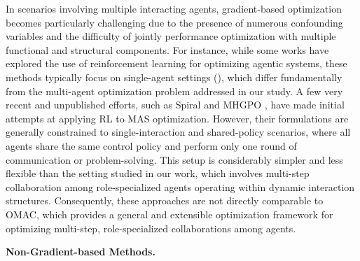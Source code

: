 In scenarios involving multiple interacting agents, gradient-based optimization becomes particularly challenging due to the presence of numerous confounding variables and the difficulty of jointly performance optimization with multiple functional and structural components. For instance, while some works have explored the use of reinforcement learning for optimizing agentic systems, these methods typically focus on single-agent settings (\cite{shao2024deepseekmath, qian2025toolrl}), which differ fundamentally from the multi-agent optimization problem addressed in our study.
A few very recent and unpublished efforts, such as Spiral \cite{liu2025spiral} and MHGPO \cite{chen2025heterogeneous}, have made initial attempts at applying RL to MAS optimization. However, their formulations are generally constrained to single-interaction and shared-policy scenarios, where all agents share the same control policy and perform only one round of communication or problem-solving. This setup is considerably simpler and less flexible than the setting studied in our work, which involves multi-step collaboration among role-specialized agents operating within dynamic interaction structures. Consequently, these approaches are not directly comparable to OMAC, which provides a general and extensible optimization framework for optimizing multi-step, role-specialized collaborations among agents.







\noindent \textbf{Non-Gradient-based Methods.}

